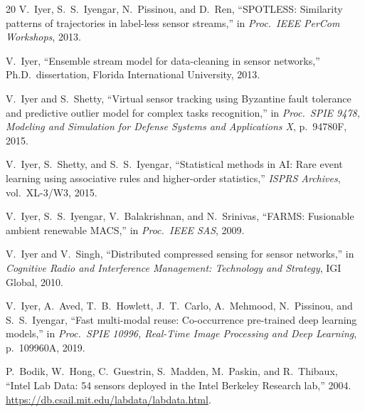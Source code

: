 \documentclass[twocolumn,11pt]{article}
\begin{document}
\begin{thebibliography}{20}
V.~Iyer, S.~S.~Iyengar, N.~Pissinou, and D.~Ren,
``SPOTLESS: Similarity patterns of trajectories in label-less sensor streams,''
in \textit{Proc.\ IEEE PerCom Workshops}, 2013.

V.~Iyer,
``Ensemble stream model for data-cleaning in sensor networks,''
Ph.D.\ dissertation, Florida International University, 2013.

V.~Iyer and S.~Shetty,
``Virtual sensor tracking using Byzantine fault tolerance and predictive
outlier model for complex tasks recognition,''
in \textit{Proc.\ SPIE 9478, Modeling and Simulation for Defense Systems
and Applications X}, p.~94780F, 2015.

V.~Iyer, S.~Shetty, and S.~S.~Iyengar,
``Statistical methods in AI: Rare event learning using associative rules
and higher-order statistics,''
\textit{ISPRS Archives}, vol.~XL-3/W3, 2015.

V.~Iyer, S.~S.~Iyengar, V.~Balakrishnan, and N.~Srinivas,
``FARMS: Fusionable ambient renewable MACS,''
in \textit{Proc.\ IEEE SAS}, 2009.

V.~Iyer and V.~Singh,
``Distributed compressed sensing for sensor networks,''
in \textit{Cognitive Radio and Interference Management:
Technology and Strategy}, IGI Global, 2010.



V.~Iyer, A.~Aved, T.~B.~Howlett, J.~T.~Carlo, A.~Mehmood,
N.~Pissinou, and S.~S.~Iyengar,
``Fast multi-modal reuse: Co-occurrence pre-trained deep learning models,''
in \textit{Proc.\ SPIE 10996, Real-Time Image Processing and
Deep Learning}, p.~109960A, 2019.

P.~Bodik, W.~Hong, C.~Guestrin, S.~Madden, M.~Paskin, and R.~Thibaux,
``Intel Lab Data: 54 sensors deployed in the Intel Berkeley
Research lab,'' 2004.
\url{https://db.csail.mit.edu/labdata/labdata.html}.

\end{thebibliography}
\end{document}

